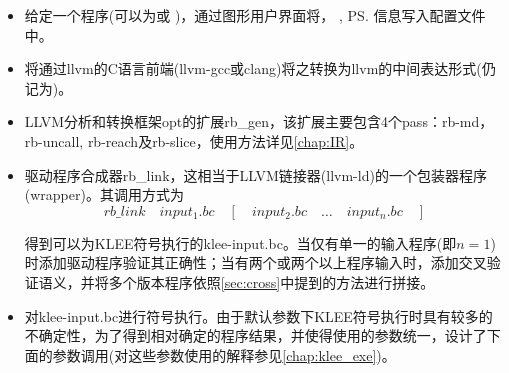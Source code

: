 \begin{itemize}
\item 给定一个程序\prog (\prog 可以为\bug 或 \patch)，通过图形用户界面将\prog\entry ， \prog\bs , \prog\ps 信息写入配置文件中。
\item 将\prog 通过llvm的C语言前端(llvm-gcc或clang)将之转换为llvm的中间表达形式(仍记为\prog )。
\item LLVM分析和转换框架opt的扩展rb\_gen，该扩展主要包含4个pass：\textmd{rb-md}，\textmd{rb-uncall}, \textmd{rb-reach}及\textmd{rb-slice}，使用方法详见\autoref{chap:IR}。
\item 驱动程序合成器rb\_link，这相当于LLVM链接器(\textmd{llvm-ld})的一个包装器程序(wrapper)。其调用方式为
  \begin{equation}
rb\_link{\quad} input_1.bc{\quad} \left[\quad input_2.bc{\quad} \ldots{\quad} input_n.bc\quad\right]
  \end{equation}

得到可以为KLEE符号执行的\textmd{klee-input.bc}。当仅有单一的输入程序(即$n=1$)时添加驱动程序验证其正确性；当有两个或两个以上程序输入时，添加交叉验证语义，并将多个版本程序依照\autoref{sec:cross}中提到的方法进行拼接。
\item 对\textmd{klee-input.bc}进行符号执行。由于默认参数下KLEE符号执行时具有较多的不确定性，为了得到相对确定的程序结果，并使得使用的参数统一，设计了下面的参数调用(对这些参数使用的解释参见\autoref{chap:klee_exe})。


\end{itemize}
